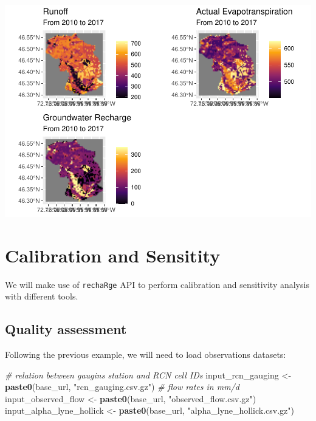 \documentclass[
]{book}
\newenvironment{Shaded}{\begin{snugshade}}{\end{snugshade}}
\newcommand{\CommentTok}[1]{\textcolor[rgb]{0.56,0.35,0.01}{\textit{#1}}}
\newcommand{\FunctionTok}[1]{\textcolor[rgb]{0.13,0.29,0.53}{\textbf{#1}}}
\newcommand{\NormalTok}[1]{#1}
\newcommand{\OtherTok}[1]{\textcolor[rgb]{0.56,0.35,0.01}{#1}}
\newcommand{\StringTok}[1]{\textcolor[rgb]{0.31,0.60,0.02}{#1}}
\begin{document}
\includegraphics{fig/sim-viz-rasters-1.pdf}

\hypertarget{calibration-and-sensitity}{%
\chapter{Calibration and Sensitity}\label{calibration-and-sensitity}}

We will make use of \texttt{rechaRge} API to perform calibration and sensitivity analysis with different tools.

\hypertarget{quality-assessment}{%
\section{Quality assessment}\label{quality-assessment}}

Following the previous example, we will need to load observations datasets:

\begin{Shaded}
\begin{Highlighting}[]
 \CommentTok{\# relation between gaugins station and RCN cell IDs}
\NormalTok{input\_rcn\_gauging }\OtherTok{\textless{}{-}} \FunctionTok{paste0}\NormalTok{(base\_url, }\StringTok{"rcn\_gauging.csv.gz"}\NormalTok{)}
 \CommentTok{\# flow rates in mm/d}
\NormalTok{input\_observed\_flow }\OtherTok{\textless{}{-}} \FunctionTok{paste0}\NormalTok{(base\_url, }\StringTok{"observed\_flow.csv.gz"}\NormalTok{)}
\NormalTok{input\_alpha\_lyne\_hollick }\OtherTok{\textless{}{-}} \FunctionTok{paste0}\NormalTok{(base\_url, }\StringTok{"alpha\_lyne\_hollick.csv.gz"}\NormalTok{)}
\end{Highlighting}
\end{Shaded}
\end{document}

